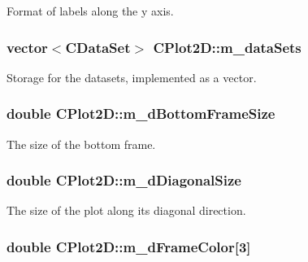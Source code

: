 Format of labels along the y axis. \hypertarget{class_c_plot2_d_a97f2e6d8b2ee958dd248847b688abeac}{
\subsubsection[{m\-\_\-data\-Sets}]{\setlength{\rightskip}{0pt plus 5cm}vector$<${\bf C\-Data\-Set}$>$ C\-Plot2\-D\-::m\-\_\-data\-Sets\hspace{0.3cm}{\ttfamily [protected]}}}\label{class_c_plot2_d_a97f2e6d8b2ee958dd248847b688abeac}
Storage for the datasets, implemented as a vector. \hypertarget{class_c_plot2_d_ab5673a2c1e5497866a397e2c2be02c64}{
\subsubsection[{m\-\_\-d\-Bottom\-Frame\-Size}]{\setlength{\rightskip}{0pt plus 5cm}double C\-Plot2\-D\-::m\-\_\-d\-Bottom\-Frame\-Size\hspace{0.3cm}{\ttfamily [protected]}}}\label{class_c_plot2_d_ab5673a2c1e5497866a397e2c2be02c64}
The size of the bottom frame. \hypertarget{class_c_plot2_d_ad56d5690e77e9848905f629f35946e9c}{
\subsubsection[{m\-\_\-d\-Diagonal\-Size}]{\setlength{\rightskip}{0pt plus 5cm}double C\-Plot2\-D\-::m\-\_\-d\-Diagonal\-Size\hspace{0.3cm}{\ttfamily [protected]}}}\label{class_c_plot2_d_ad56d5690e77e9848905f629f35946e9c}
The size of the plot along its diagonal direction. \hypertarget{class_c_plot2_d_ab80fd234bcf98f22206e7ffa8c0fe181}{
\subsubsection[{m\-\_\-d\-Frame\-Color}]{\setlength{\rightskip}{0pt plus 5cm}double C\-Plot2\-D\-::m\-\_\-d\-Frame\-Color\mbox{[}3\mbox{]}\hspace{0.3cm}{\ttfamily [protected]}}}\label{class_c_plot2_d_ab80fd234bcf98f22206e7ffa8c0fe181}

